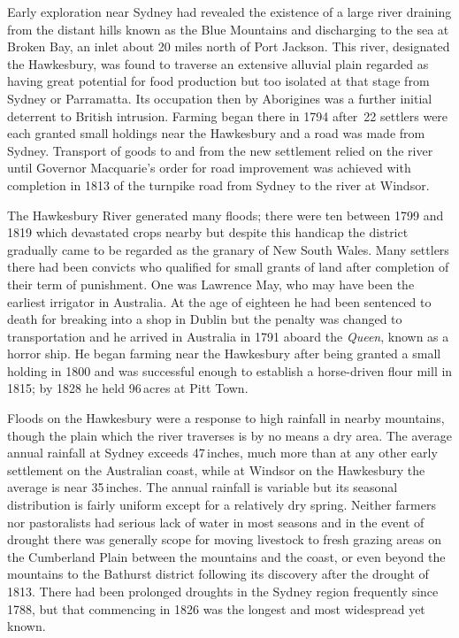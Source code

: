 Early exploration near Sydney had revealed the existence of a large
river draining from the distant hills known as the Blue Mountains and
discharging to the sea at Broken Bay, an inlet about 20 miles north of
Port Jackson.  This river, designated the
Hawkesbury, was found to traverse an extensive
alluvial plain regarded as having great potential for food production
but too isolated at that stage from Sydney or Parramatta.  Its
occupation then by Aborigines was a further initial
deterrent to British intrusion.  Farming began there in 1794 after~22
settlers were each granted small holdings near the Hawkesbury and a
road was made from Sydney. Transport of goods to and from the new
settlement relied on the river until Governor
Macquarie's order for road improvement was
achieved with completion in 1813 of the turnpike road from Sydney to
the river at Windsor.

The Hawkesbury River generated many floods; there were
ten between 1799 and 1819 which devastated crops nearby but despite
this handicap the district gradually came to be regarded as the
granary of New South Wales. Many settlers there had been convicts who
qualified for small grants of land after completion of their term of
punishment. One was Lawrence May, who may have been the
earliest irrigator in Australia. At the age of eighteen he had been
sentenced to death for breaking into a shop in Dublin but the penalty
was changed to transportation and he arrived in Australia in 1791
aboard the
\textit{Queen}, known as a horror ship. He began farming near the
Hawkesbury after being granted a small holding in 1800 and was
successful enough to establish a horse-driven flour mill in 1815; by
1828 he held 96\,acres at Pitt Town.

Floods on the Hawkesbury were a response to high rainfall in nearby
mountains, though the plain which the river traverses is by no means a
dry area.  The average annual rainfall at Sydney exceeds 47\,inches,
much more than at any other early settlement on the Australian coast,
while at Windsor  on the Hawkesbury the average is
near 35\,inches. The annual rainfall is variable but its seasonal
distribution is fairly uniform except for a relatively dry spring.
Neither farmers nor pastoralists had serious lack of water in most
seasons and in the event of drought there was generally
scope for moving livestock to fresh grazing areas on the Cumberland
Plain between the mountains and the coast, or even beyond the
mountains to the Bathurst district following its discovery after the
drought of 1813.  There had been prolonged droughts in the Sydney
region frequently since 1788, but that commencing in 1826 was the
longest and most widespread yet known.

